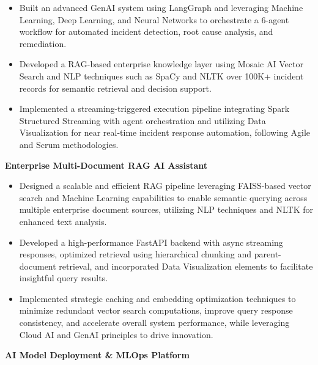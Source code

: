 \documentclass[11pt,a4paper]{article}
\begin{document}
    
    \vspace{1mm}
    \begin{itemize}[leftmargin=*, topsep=0pt, partopsep=0pt]
        \item Built an advanced GenAI system using LangGraph and leveraging Machine Learning, Deep Learning, and Neural Networks to orchestrate a 6-agent workflow for automated incident detection, root cause analysis, and remediation.
        \item Developed a RAG-based enterprise knowledge layer using Mosaic AI Vector Search and NLP techniques such as SpaCy and NLTK over 100K+ incident records for semantic retrieval and decision support.
        \item Implemented a streaming-triggered execution pipeline integrating Spark Structured Streaming with agent orchestration and utilizing Data Visualization for near real-time incident response automation, following Agile and Scrum methodologies.
    \end{itemize}
    \vspace{2mm}
    \noindent
    \textbf{ Enterprise Multi-Document RAG AI Assistant }
 \\
    

    
    \vspace{1mm}
    \begin{itemize}[leftmargin=*, topsep=0pt, partopsep=0pt]
        \item Designed a scalable and efficient RAG pipeline leveraging FAISS-based vector search and Machine Learning capabilities to enable semantic querying across multiple enterprise document sources, utilizing NLP techniques and NLTK for enhanced text analysis.
        \item Developed a high-performance FastAPI backend with async streaming responses, optimized retrieval using hierarchical chunking and parent-document retrieval, and incorporated Data Visualization elements to facilitate insightful query results.
        \item Implemented strategic caching and embedding optimization techniques to minimize redundant vector search computations, improve query response consistency, and accelerate overall system performance, while leveraging Cloud AI and GenAI principles to drive innovation.
    \end{itemize}
    \vspace{2mm}
    \noindent
    \textbf{ AI Model Deployment \& MLOps Platform }
 \\
    
\end{document}
